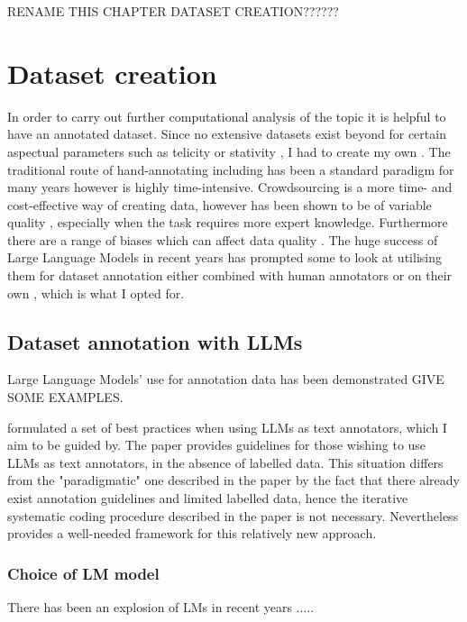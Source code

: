
RENAME THIS CHAPTER DATASET CREATION??????

\section{Dataset creation}
In order to carry out further computational analysis of the topic it is helpful to have an annotated dataset. Since no extensive datasets exist beyond for certain aspectual parameters such as telicity \citep{friedrich-gateva-2017-classification} or stativity \citep{Friedrich2014AutomaticPO}, I had to create my own \citep{friedrich-etal-2023-kind}. The traditional route of hand-annotating including has been a standard paradigm for many years however is highly time-intensive. Crowdsourcing is a more time- and cost-effective way of creating data, however has been shown to be of variable quality \citep{li2024comparative}, especially when the task requires more expert knowledge. Furthermore there are a range of biases which can affect data quality \citep{Beck2023}. The huge success of Large Language Models in recent years has prompted some to look at utilising them for dataset annotation either combined with human annotators \citep{goel2023llms} or on their own \citep{he2023annollm, llmsForPragAndDiscAnalysis, Gilardi_2023}, which is what I opted for.

\subsection{Dataset annotation with LLMs}
Large Language Models' use for annotation data has been demonstrated GIVE SOME EXAMPLES.  

\citet{törnberg2024best} formulated a set of best practices when using LLMs as text annotators, which I aim to be guided by. The paper provides guidelines for those wishing to use LLMs as text annotators, in the absence of labelled data. This situation differs from the "paradigmatic" one described in the paper by the fact that there already exist annotation guidelines and limited labelled data, hence the iterative systematic coding procedure described in the paper is not necessary. Nevertheless \citet{törnberg2024best} provides a well-needed framework for this relatively new approach. 

\subsubsection*{Choice of LM model}
There has been an explosion of LMs in recent years .....

